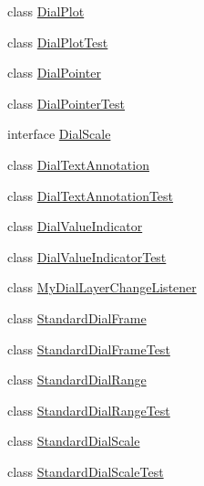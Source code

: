 \begin{DoxyCompactItemize}
class \mbox{\hyperlink{classorg_1_1jfree_1_1chart_1_1plot_1_1dial_1_1_dial_plot}{Dial\+Plot}}
\item 
class \mbox{\hyperlink{classorg_1_1jfree_1_1chart_1_1plot_1_1dial_1_1_dial_plot_test}{Dial\+Plot\+Test}}
\item 
class \mbox{\hyperlink{classorg_1_1jfree_1_1chart_1_1plot_1_1dial_1_1_dial_pointer}{Dial\+Pointer}}
\item 
class \mbox{\hyperlink{classorg_1_1jfree_1_1chart_1_1plot_1_1dial_1_1_dial_pointer_test}{Dial\+Pointer\+Test}}
\item 
interface \mbox{\hyperlink{interfaceorg_1_1jfree_1_1chart_1_1plot_1_1dial_1_1_dial_scale}{Dial\+Scale}}
\item 
class \mbox{\hyperlink{classorg_1_1jfree_1_1chart_1_1plot_1_1dial_1_1_dial_text_annotation}{Dial\+Text\+Annotation}}
\item 
class \mbox{\hyperlink{classorg_1_1jfree_1_1chart_1_1plot_1_1dial_1_1_dial_text_annotation_test}{Dial\+Text\+Annotation\+Test}}
\item 
class \mbox{\hyperlink{classorg_1_1jfree_1_1chart_1_1plot_1_1dial_1_1_dial_value_indicator}{Dial\+Value\+Indicator}}
\item 
class \mbox{\hyperlink{classorg_1_1jfree_1_1chart_1_1plot_1_1dial_1_1_dial_value_indicator_test}{Dial\+Value\+Indicator\+Test}}
\item 
class \mbox{\hyperlink{classorg_1_1jfree_1_1chart_1_1plot_1_1dial_1_1_my_dial_layer_change_listener}{My\+Dial\+Layer\+Change\+Listener}}
\item 
class \mbox{\hyperlink{classorg_1_1jfree_1_1chart_1_1plot_1_1dial_1_1_standard_dial_frame}{Standard\+Dial\+Frame}}
\item 
class \mbox{\hyperlink{classorg_1_1jfree_1_1chart_1_1plot_1_1dial_1_1_standard_dial_frame_test}{Standard\+Dial\+Frame\+Test}}
\item 
class \mbox{\hyperlink{classorg_1_1jfree_1_1chart_1_1plot_1_1dial_1_1_standard_dial_range}{Standard\+Dial\+Range}}
\item 
class \mbox{\hyperlink{classorg_1_1jfree_1_1chart_1_1plot_1_1dial_1_1_standard_dial_range_test}{Standard\+Dial\+Range\+Test}}
\item 
class \mbox{\hyperlink{classorg_1_1jfree_1_1chart_1_1plot_1_1dial_1_1_standard_dial_scale}{Standard\+Dial\+Scale}}
\item 
class \mbox{\hyperlink{classorg_1_1jfree_1_1chart_1_1plot_1_1dial_1_1_standard_dial_scale_test}{Standard\+Dial\+Scale\+Test}}
\end{DoxyCompactItemize}
